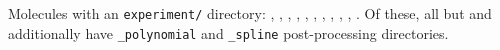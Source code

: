 \documentclass[sigconf,screen,nonacm]{acmart}
\begin{document}
Molecules with an \texttt{experiment/} directory: , ,
, , , , , , ,
, . Of these, all but  and  additionally have
\texttt{\_polynomial} and \texttt{\_spline} post-processing directories.



\end{document}
